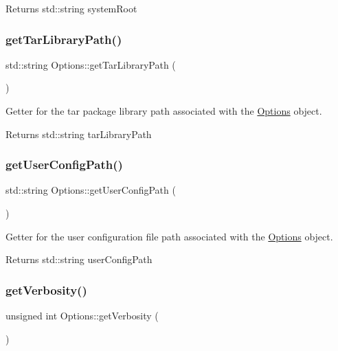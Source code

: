 \begin{DoxyReturn}{Returns}
std\+::string system\+Root 
\end{DoxyReturn}
\mbox{\label{classOptions_a378f5ced3e8499fd26cc2b113bcd7642}} 
\subsubsection{\texorpdfstring{getTarLibraryPath()}{getTarLibraryPath()}}
{\footnotesize\ttfamily std\+::string Options\+::get\+Tar\+Library\+Path (\begin{DoxyParamCaption}{ }\end{DoxyParamCaption})}



Getter for the tar package library path associated with the \mbox{\hyperlink{classOptions}{Options}} object. 

\begin{DoxyReturn}{Returns}
std\+::string tar\+Library\+Path 
\end{DoxyReturn}
\mbox{\label{classOptions_a2b06d8f1e5fad600abde17edc713f921}} 
\subsubsection{\texorpdfstring{getUserConfigPath()}{getUserConfigPath()}}
{\footnotesize\ttfamily std\+::string Options\+::get\+User\+Config\+Path (\begin{DoxyParamCaption}{ }\end{DoxyParamCaption})}



Getter for the user configuration file path associated with the \mbox{\hyperlink{classOptions}{Options}} object. 

\begin{DoxyReturn}{Returns}
std\+::string user\+Config\+Path 
\end{DoxyReturn}
\mbox{\label{classOptions_ac83d54ab2f7e5deb400e751014867d31}} 
\subsubsection{\texorpdfstring{getVerbosity()}{getVerbosity()}}
{\footnotesize\ttfamily unsigned int Options\+::get\+Verbosity (\begin{DoxyParamCaption}{ }\end{DoxyParamCaption})}



